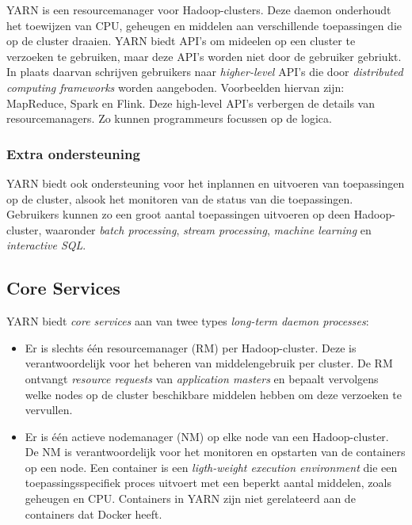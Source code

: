 \documentclass[a4paper,10pt,twoside]{report}
\begin{document}
YARN is een resourcemanager voor Hadoop-clusters. Deze daemon onderhoudt het toewijzen van CPU, geheugen en middelen aan verschillende toepassingen die op de cluster draaien. YARN biedt API's om mideelen op een cluster te verzoeken te gebruiken, maar deze API's worden niet door de gebruiker gebriukt. In plaats daarvan schrijven gebruikers naar \textit{higher-level} API's die door \textit{distributed computing frameworks} worden aangeboden. Voorbeelden hiervan zijn: MapReduce, Spark en Flink. Deze high-level API's verbergen de details van resourcemanagers. Zo kunnen programmeurs focussen op de logica.

\subsubsection{Extra ondersteuning}

YARN biedt ook ondersteuning voor het inplannen en uitvoeren van toepassingen op de cluster, alsook het monitoren van de status van die toepassingen. Gebruikers kunnen zo een groot aantal toepassingen uitvoeren op deen Hadoop-cluster, waaronder \textit{batch processing}, \textit{stream processing}, \textit{machine learning} en \textit{interactive SQL}.

\subsection{Core Services}

YARN biedt \textit{core services} aan van twee types \textit{long-term daemon processes}: 

\begin{itemize}
	\item Er is slechts één resourcemanager (RM) per Hadoop-cluster. Deze is verantwoordelijk voor het beheren van middelengebruik per cluster. De RM ontvangt \textit{resource requests} van \textit{application masters} en bepaalt vervolgens welke nodes op de cluster beschikbare middelen hebben om deze verzoeken te vervullen.
	\item Er is één actieve nodemanager (NM) op elke node van een Hadoop-cluster. De NM is verantwoordelijk voor het monitoren en opstarten van de containers op een node. Een container is een \textit{ligth-weight execution environment} die een toepassingsspecifiek proces uitvoert met een beperkt aantal middelen, zoals geheugen en CPU. Containers in YARN zijn niet gerelateerd aan de containers dat Docker heeft.
\end{itemize}
\end{document}
